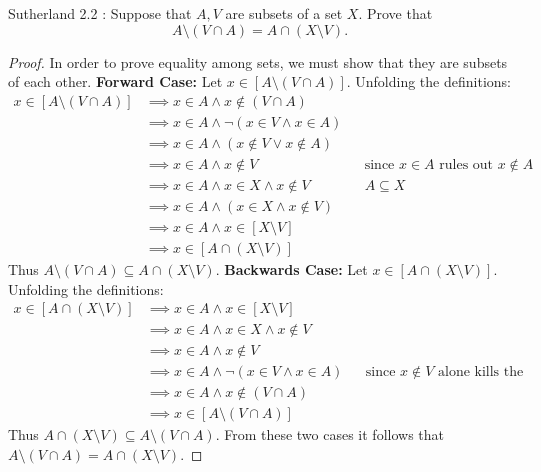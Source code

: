 \documentclass{homework}
\begin{document}
\begin{problems}
\problem Sutherland 2.2 :
Suppose that $A, V$ are subsets of a set $X$. Prove that
\[
A \setminus (V \cap A) = A \cap (X \setminus V).
\]
\solution
  \begin{proof}
$ $\newline In order to prove equality among sets, we must show that they are subsets of each other.
    \textbf{Forward Case:} Let $x \in [A \setminus (V \cap A)]$. Unfolding the definitions:
    \begin{align*}
      x \in [A \setminus (V \cap A)] &\implies x \in A \land x \notin (V \cap A) \\
      &\implies x \in A \land \neg(x \in V \land x \in A) \\
      &\implies x \in A \land (x \notin V \lor x \notin A) \\
      &\implies x \in A \land x \notin V && \text{since $x \in A$ rules out $x \notin A$}\\
      &\implies x \in A \land x \in X \land x \notin V && \text{$A \subseteq X$}\\
      &\implies x \in A \land (x \in X \land x \notin V) \\
      &\implies x \in A \land x \in [X \setminus V] \\
      &\implies x \in [A \cap (X \setminus V)]
    \end{align*}
    Thus $A \setminus (V \cap A) \subseteq A \cap (X \setminus V)$. \newline
    \textbf{Backwards Case:} Let $x \in [A \cap (X \setminus V)]$. Unfolding the definitions:
      \begin{align*}
        x \in [A \cap (X \setminus V)] &\implies x \in A \land x \in [X \setminus V] \\
        &\implies x \in A \land x \in X \land x \notin V \\
        &\implies x \in A \land x \notin V \\
        &\implies x \in A \land \neg(x \in V \land x \in A) && \text{since $x\notin V$ alone kills the conjunction}\\
        &\implies x \in A \land x \notin (V \cap A) \\
        &\implies x \in [A \setminus (V \cap A)]
      \end{align*}
      Thus $A \cap (X \setminus V) \subseteq A \setminus (V \cap A)$.
      From these two cases it follows that $A \setminus (V \cap A) = A \cap (X \setminus V)$.
\end{proof}


\end{problems}
\end{document}
